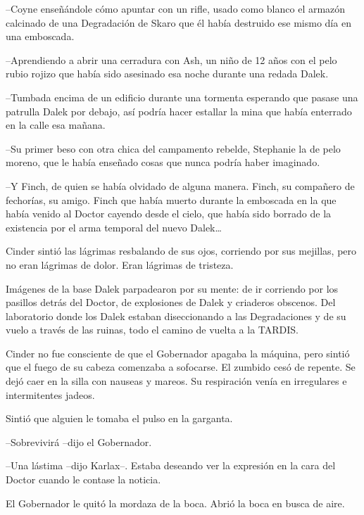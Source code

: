 --Coyne enseñándole cómo apuntar con un rifle, usado como blanco el armazón calcinado de una Degradación de Skaro que él había destruido ese mismo día en una emboscada. 



--Aprendiendo a abrir una cerradura con Ash, un niño de 12 años con el pelo rubio rojizo que había sido asesinado esa noche durante una redada Dalek. 



--Tumbada encima de un edificio durante una tormenta esperando que pasase una patrulla Dalek por debajo, así podría hacer estallar la mina que había enterrado en la calle esa mañana. 



--Su primer beso con otra chica del campamento rebelde, Stephanie la de pelo moreno, que le había enseñado cosas que nunca podría haber imaginado. 



--Y Finch, de quien se había olvidado de alguna manera. Finch, su compañero de fechorías, su amigo. Finch que había muerto durante la emboscada en la que había venido al Doctor cayendo desde el cielo, que había sido borrado de la existencia por el arma temporal del nuevo Dalek… 



Cinder sintió las lágrimas resbalando de sus ojos, corriendo por sus mejillas, pero no eran lágrimas de dolor. Eran lágrimas de tristeza. 

Imágenes de la base Dalek parpadearon por su mente: de ir corriendo por los pasillos detrás del Doctor, de explosiones de Dalek y criaderos obscenos. Del laboratorio donde los Dalek estaban diseccionando a las Degradaciones y de su vuelo a través de las ruinas, todo el camino de vuelta a la TARDIS. 

Cinder no fue consciente de que el Gobernador apagaba la máquina, pero sintió que el fuego de su cabeza comenzaba a sofocarse. El zumbido cesó de repente. Se dejó caer en la silla con nauseas y mareos. Su respiración venía en irregulares e intermitentes jadeos. 

Sintió que alguien le tomaba el pulso en la garganta. 



--Sobrevivirá --dijo el Gobernador. 

--Una lástima --dijo Karlax--. Estaba deseando ver la expresión en la cara del Doctor cuando le contase la noticia. 



El Gobernador le quitó la mordaza de la boca. Abrió la boca en busca de aire. 



